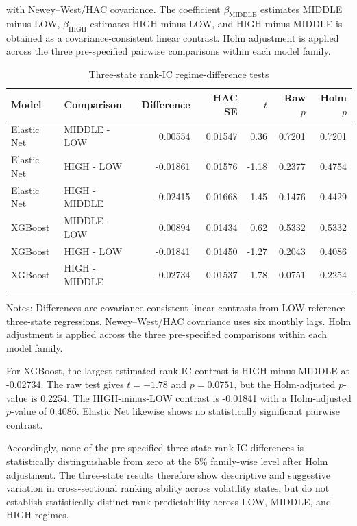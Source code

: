with Newey--West/HAC covariance. The coefficient $\beta_{\mathrm{MIDDLE}}$ estimates MIDDLE minus LOW, $\beta_{\mathrm{HIGH}}$ estimates HIGH minus LOW, and HIGH minus MIDDLE is obtained as a covariance-consistent linear contrast. Holm adjustment is applied across the three pre-specified pairwise comparisons within each model family.

\begin{table}[htbp]
\centering
\caption{Three-state rank-IC regime-difference tests}
\label{tab:rank-ic-regime-differences}
\small
\begin{tabular}{llrrrrr}
\hline
Model & Comparison & Difference & HAC SE & $t$ & Raw $p$ & Holm $p$ \\
\hline
Elastic Net & MIDDLE - LOW  &  0.00554 & 0.01547 &  0.36 & 0.7201 & 0.7201 \\
Elastic Net & HIGH - LOW    & -0.01861 & 0.01576 & -1.18 & 0.2377 & 0.4754 \\
Elastic Net & HIGH - MIDDLE & -0.02415 & 0.01668 & -1.45 & 0.1476 & 0.4429 \\
XGBoost     & MIDDLE - LOW  &  0.00894 & 0.01434 &  0.62 & 0.5332 & 0.5332 \\
XGBoost     & HIGH - LOW    & -0.01841 & 0.01450 & -1.27 & 0.2043 & 0.4086 \\
XGBoost     & HIGH - MIDDLE & -0.02734 & 0.01537 & -1.78 & 0.0751 & 0.2254 \\
\hline
\end{tabular}
\begin{flushleft}
\small
Notes: Differences are covariance-consistent linear contrasts from LOW-reference three-state regressions. Newey--West/HAC covariance uses six monthly lags. Holm adjustment is applied across the three pre-specified comparisons within each model family.
\end{flushleft}
\end{table}

For XGBoost, the largest estimated rank-IC contrast is HIGH minus MIDDLE at -0.02734. The raw test gives $t=-1.78$ and $p=0.0751$, but the Holm-adjusted $p$-value is 0.2254. The HIGH-minus-LOW contrast is -0.01841 with a Holm-adjusted $p$-value of 0.4086. Elastic Net likewise shows no statistically significant pairwise contrast.

Accordingly, none of the pre-specified three-state rank-IC differences is statistically distinguishable from zero at the 5\% family-wise level after Holm adjustment. The three-state results therefore show descriptive and suggestive variation in cross-sectional ranking ability across volatility states, but do not establish statistically distinct rank predictability across LOW, MIDDLE, and HIGH regimes.


